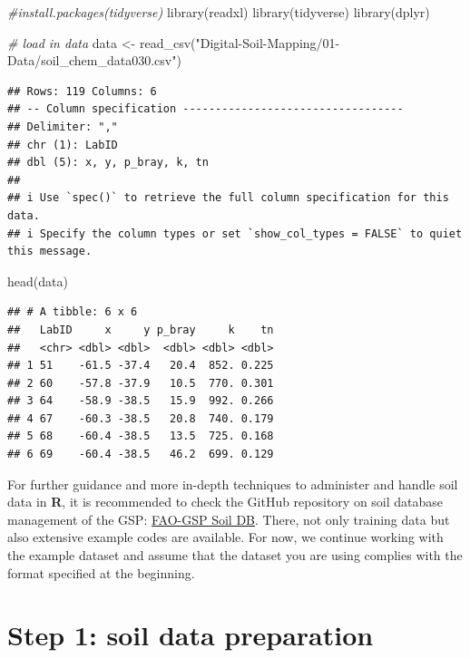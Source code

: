 \documentclass[
  10pt,
  b5paper,
  oneside]{book}
\newenvironment{Shaded}{\begin{snugshade}}{\end{snugshade}}
\newcommand{\CommentTok}[1]{\textcolor[rgb]{0.56,0.35,0.01}{\textit{#1}}}
\newcommand{\FunctionTok}[1]{\textcolor[rgb]{0.00,0.00,0.00}{#1}}
\newcommand{\NormalTok}[1]{#1}
\newcommand{\OtherTok}[1]{\textcolor[rgb]{0.56,0.35,0.01}{#1}}
\newcommand{\StringTok}[1]{\textcolor[rgb]{0.31,0.60,0.02}{#1}}
\begin{document}
\begin{Shaded}
\begin{Highlighting}[]
\CommentTok{\#install.packages(tidyverse)}
\FunctionTok{library}\NormalTok{(readxl)}
\FunctionTok{library}\NormalTok{(tidyverse)}
\FunctionTok{library}\NormalTok{(dplyr)}

\CommentTok{\# load in data}
\NormalTok{data }\OtherTok{\textless{}{-}} 
  \FunctionTok{read\_csv}\NormalTok{(}\StringTok{"Digital{-}Soil{-}Mapping/01{-}Data/soil\_chem\_data030.csv"}\NormalTok{)}
\end{Highlighting}
\end{Shaded}

\begin{verbatim}
## Rows: 119 Columns: 6
## -- Column specification ----------------------------------
## Delimiter: ","
## chr (1): LabID
## dbl (5): x, y, p_bray, k, tn
## 
## i Use `spec()` to retrieve the full column specification for this data.
## i Specify the column types or set `show_col_types = FALSE` to quiet this message.
\end{verbatim}

\begin{Shaded}
\begin{Highlighting}[]
\FunctionTok{head}\NormalTok{(data)}
\end{Highlighting}
\end{Shaded}

\begin{verbatim}
## # A tibble: 6 x 6
##   LabID     x     y p_bray     k    tn
##   <chr> <dbl> <dbl>  <dbl> <dbl> <dbl>
## 1 51    -61.5 -37.4   20.4  852. 0.225
## 2 60    -57.8 -37.9   10.5  770. 0.301
## 3 64    -58.9 -38.5   15.9  992. 0.266
## 4 67    -60.3 -38.5   20.8  740. 0.179
## 5 68    -60.4 -38.5   13.5  725. 0.168
## 6 69    -60.4 -38.5   46.2  699. 0.129
\end{verbatim}

For further guidance and more in-depth techniques to administer and handle soil data in \textbf{R}, it is recommended to check the GitHub repository on soil database management of the GSP: \href{https://github.com/FAO-GSP/SoilDB}{FAO-GSP Soil DB}. There, not only training data but also extensive example codes are available.
For now, we continue working with the example dataset and assume that the dataset you are using complies with the format specified at the beginning.

\hypertarget{step-1-soil-data-preparation}{%
\chapter{Step 1: soil data preparation}\label{step-1-soil-data-preparation}}
\end{document}
